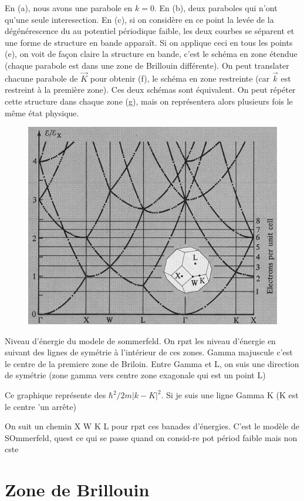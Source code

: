 	En (a), nous avons une parabole en $k=0$. En (b), deux paraboles qui n'ont qu'une 
	seule interesection. En (c), si on considère en ce point la levée de la dégénérescence 
	du au potentiel périodique faible, les deux courbes se séparent et une forme de 
	structure en bande apparaît. Si on applique ceci en tous les points (e), on voit de 
	façon claire la structure en bande, c'est le schéma en zone étendue (chaque parabole 
	est dans une zone de Brillouin différente). On peut translater chacune parabole de 
	$\vec{K}$ pour obtenir (f), le schéma en zone restreinte (car $\vec k$ est restreint 
	à la première zone). Ces deux schémas sont équivalent. On peut répéter cette structure 
	dans chaque zone (g), mais on représentera alors plusieurs fois le même état physique. 
	
	
	\newpage
	\begin{figure}
	\vspace{-1.5cm}
	\includegraphics[scale=0.6]{ch5/image4.png}
	\end{figure}
	Niveau d'énergie du modele de sommerfeld. On rpzt les niveau d'énergie en suivant des lignes de symétrie à l'intérieur de ces zones. Gamma majuscule c'est le centre de la premiere zone de Briloin. Entre Gamma et L, on suis  une direction de symétrie (zone gamma vers centre zone exagonale qui est un point L)

Ce graphique représente des $\hbar^2/2m |k-K|^2$. Si je suis une ligne Gamma K (K est le centre 'un arrête)

On suit un chemin X W K L pour rpzt ces banades d'énergies. C'est le modèle de SOmmerfeld, quest ce qui se passe quand on consid-re pot périod faible mais non cste

	\section{Zone de Brillouin}


	